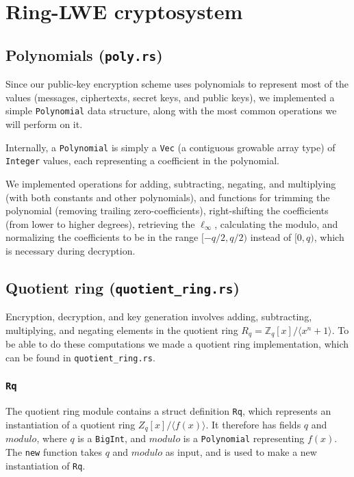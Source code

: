 \documentclass[../main.tex]{subfiles}
\begin{document}
\section{Ring-LWE cryptosystem}

\subsection{Polynomials (\lstinline{poly.rs})}

Since our public-key encryption scheme uses polynomials to represent most of the values (messages, ciphertexts, secret keys, and public keys), we implemented a simple \lstinline{Polynomial} data structure, along with the most common operations we will perform on it.

Internally, a \lstinline{Polynomial} is simply a \lstinline{Vec} (a contiguous growable array type) of \lstinline{Integer} values, each representing a coefficient in the polynomial.

We implemented operations for adding, subtracting, negating, and multiplying (with both constants and other polynomials), and functions for trimming the polynomial (removing trailing zero-coefficients), right-shifting the coefficients (from lower to higher degrees), retrieving the $\ell_\infty$, calculating the modulo, and normalizing the coefficients to be in the range $[-q/2, q/2)$ instead of $[0, q)$, which is necessary during decryption.

\subsection{Quotient ring (\lstinline{quotient_ring.rs})}

Encryption, decryption, and key generation involves adding, subtracting, multiplying, and negating elements in the quotient ring $R_q = \mathbb{Z}_q[x]/\langle x^n + 1 \rangle$. To be able to do these computations we made a quotient ring implementation, which can be found in \lstinline{quotient_ring.rs}.

\subsubsection{\lstinline{Rq}}

The quotient ring module contains a struct definition \lstinline{Rq}, which represents an instantiation of a quotient ring $Z_q[x]/\langle f(x) \rangle$. It therefore has fields $q$ and $modulo$, where $q$ is a \lstinline{BigInt}, and $modulo$ is a \lstinline{Polynomial} representing $f(x)$. The \lstinline{new} function takes $q$ and $modulo$ as input, and is used to make a new instantiation of \lstinline{Rq}.
\end{document}
